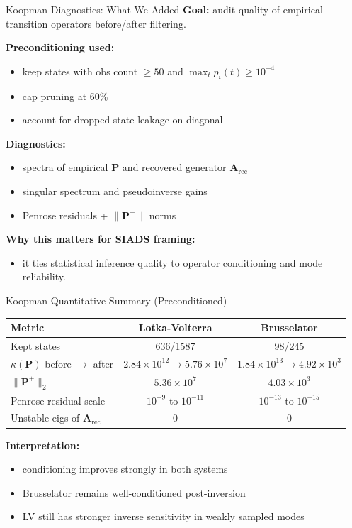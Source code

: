 \documentclass[10pt,aspectratio=169]{beamer}
\newcommand{\bA}{\mathbf{A}}
\newcommand{\bP}{\mathbf{P}}
\begin{document}
\begin{frame}{Koopman Diagnostics: What We Added}
\textbf{Goal:} audit quality of empirical transition operators before/after filtering.

\vspace{0.3em}
\textbf{Preconditioning used:}
\begin{itemize}
    \item keep states with obs count $\ge 50$ and $\max_t p_i(t)\ge 10^{-4}$
    \item cap pruning at 60\%
    \item account for dropped-state leakage on diagonal
\end{itemize}

\vspace{0.3em}
\textbf{Diagnostics:}
\begin{itemize}
    \item spectra of empirical $\bP$ and recovered generator $\bA_{\text{rec}}$
    \item singular spectrum and pseudoinverse gains
    \item Penrose residuals + $\|\bP^+\|$ norms
\end{itemize}

\vspace{0.3em}
\textbf{Why this matters for SIADS framing:}
\begin{itemize}
    \item it ties statistical inference quality to operator conditioning and mode reliability.
\end{itemize}
\end{frame}

\begin{frame}{Koopman Quantitative Summary (Preconditioned)}
\begin{center}
\begin{tabular}{lcc}
\toprule
\textbf{Metric} & \textbf{Lotka-Volterra} & \textbf{Brusselator} \\
\midrule
Kept states & 636/1587 & 98/245 \\
$\kappa(\bP)$ before $\to$ after & $2.84\!\times\!10^{12}\to 5.76\!\times\!10^7$ & $1.84\!\times\!10^{13}\to 4.92\!\times\!10^3$ \\
$\|\bP^+\|_2$ & $5.36\times 10^7$ & $4.03\times 10^3$ \\
Penrose residual scale & $10^{-9}$ to $10^{-11}$ & $10^{-13}$ to $10^{-15}$ \\
Unstable eigs of $\bA_{\text{rec}}$ & 0 & 0 \\
\bottomrule
\end{tabular}
\end{center}

\vspace{0.3em}
\textbf{Interpretation:}
\begin{itemize}
    \item conditioning improves strongly in both systems
    \item Brusselator remains well-conditioned post-inversion
    \item LV still has stronger inverse sensitivity in weakly sampled modes
\end{itemize}
\end{frame}
\end{document}
